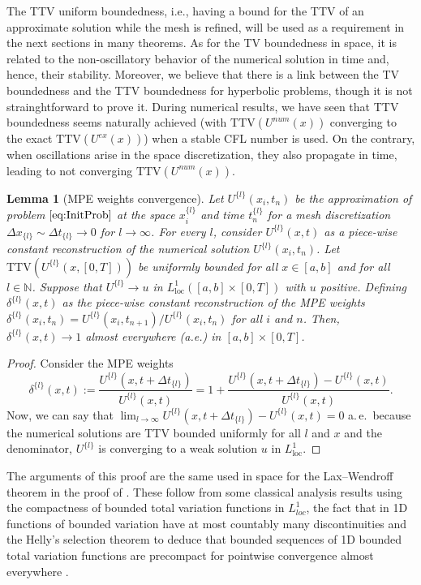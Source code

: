 \documentclass[final,11pt, times, linenumber, nopreprintline]{elsarticle}
\def\TTV{\text{TTV}}
\newtheorem{lem}[thm]{Lemma}
\begin{document}
\begin{rmk}
	The TTV uniform boundedness, i.e., having a bound for the TTV of an approximate solution while the mesh is refined, will be used as a requirement in the next sections in many theorems. As for the TV boundedness in space, it is related to the non-oscillatory behavior of the numerical solution in time and, hence, their stability. 
	Moreover, we believe that there is a link between the TV boundedness and the TTV boundedness for hyperbolic problems, though it is not strainghtforward to prove it.
	During numerical results, we have seen that TTV boundedness seems naturally achieved 
	(with $\text{TTV}(U^{num}(x))$
	 converging to the exact $\text{TTV}(U^{ex}(x)) $) 
	 when a stable CFL number is used. On the contrary, when oscillations arise in the space discretization, they also propagate in time, leading to not converging $\text{TTV}(U^{num}(x))$. 
\end{rmk}

\begin{lem}[MPE weights convergence]\label{lem:delta}
Let $U^{\{l\}}(x_i,t_n)$ be the approximation of problem $\eqref{eq:InitProb}$ at the space $x^{\{l\}}_i$ and time $t_n^{\{l\}}$ for a mesh discretization $\Delta x_{\{l\}}\sim \Delta t_{\{l\}}\to 0$ for $l\to \infty$. For every $l$, consider $U^{\{l\}}(x,t)$ as a piece-wise constant reconstruction of the numerical solution $U^{\{l\}}(x_i,t_n)$. Let $\TTV(U^{\{l\}}(x,[0,T]))$ be uniformly bounded for all $x\in [a,b]$ and for all $l\in \mathbb N$. Suppose that $U^{\{l\}}\to u$ in $L^1_{\text{loc}}([a,b]\times [0,T] )$ with $u$ positive. Defining $\delta^{\{l\}}(x,t)$ as the piece-wise constant reconstruction of the MPE weights $\delta^{\{l\}}(x_i,t_n)=U^{\{l\}}(x_i,t_{n+1})/U^{\{l\}}(x_i,t_n)$ for all $i$ and $n$. Then, $\delta^{\{l\}}(x,t) \to 1$ almost everywhere (a.e.) in $[a,b]\times [0,T]$.
\end{lem}


\begin{proof}
	Consider the MPE weights 
	$$\delta^{\{l\}}(x,t):= \frac{U^{\{l\}}(x,t+\Delta t_{\{l\}})}{U^{\{l\}}(x,t)}=1+\frac{U^{\{l\}}(x,t+\Delta t_{\{l\}})-U^{\{l\}}(x,t)}{U^{\{l\}}(x,t)}.$$%
	Now, we can say that $\lim_{l\to\infty} U^{\{l\}}(x,t+\Delta t_{\{l\}})-U^{\{l\}}(x,t) = 0$ a.\,e.\ because the numerical solutions are TTV bounded uniformly for all $l$ and $x$ and the denominator, $U^{\{l\}}$ is converging to a weak solution $u$ in $L^1_{\text{loc}}$.
\end{proof}
The arguments of this proof are the same used in space for the Lax--Wendroff theorem in the proof of \cite{leveque_numerical_1992}. These follow from some classical analysis results using the compactness of bounded total variation functions in $L^1_{loc}$, the fact that in 1D functions of bounded variation have at most countably many discontinuities and the Helly’s selection theorem to deduce that bounded sequences of 1D bounded total variation functions are precompact for pointwise convergence almost everywhere \cite{ambrosio2000functions}.
\end{document}

